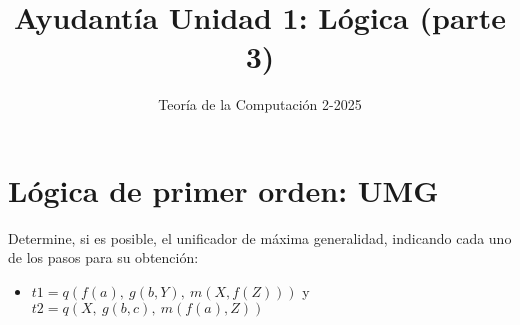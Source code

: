 \documentclass{article}
\begin{document}
\title{Ayudantía Unidad 1: Lógica (parte 3)}
\author{Teoría de la Computación 2-2025}
\date{}

\maketitle

\section{Lógica de primer orden: UMG}

Determine, si es posible, el unificador de máxima generalidad, indicando cada uno de los pasos para su obtención:

\begin{itemize}
  \item $t1 = q(f(a),\ g(b, Y),\ m(X, f(Z)))$ y
        $t2 = q(X,\ g(b, c),\ m(f(a), Z))$
\end{itemize}
\end{document}
